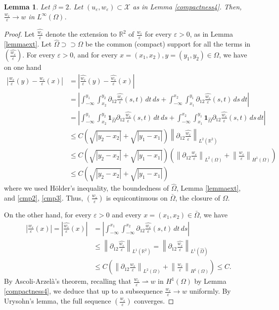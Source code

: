 \documentclass[a4, 11pt, reqno, final]{amsart}
\newcommand{\calX}{\mathcal{X}}
\newcommand{\bbR}{\mathbb{R}}
\newcommand{\n}[1]{\left\|#1\right\|}  %
\newcommand\e{\varepsilon}
\newcommand\weak{\rightharpoonup} %
\theoremstyle{plain}%
\newtheorem{lemma}[theorem]{Lemma}
\newcommand{\QED}{\hspace{1ex}\hfill$\blacksquare$\vspace{2ex}}
\begin{document}
	\begin{lemma}\label{lemmaunif} Let $\beta =2$.
		Let $(u_\e, w_{\e})\subset \calX$  as in Lemma \ref{compactness4}. Then,
		$\frac{w_\e}{\e} \to w$ in $L^\infty(\Omega)$.
	\end{lemma}
	\begin{proof}
		Let $\hat{\frac{w_\e}{\e}}$ denote the extension to $\mathbb{R}^2$ of $\frac{w_\e}{\e}$ for every $\e>0$, as in Lemma \ref{lemmaext}. Let $\hat{\Omega}\supset\supset \Omega$ be the common (compact) support for all the terms in $(\hat{\frac{w_\e}{\e}})$.
		For every $\e>0$, and for every $x=(x_1,x_2),y=(y_1,y_2) \in \Omega$, we have on one hand
		$$ \begin{aligned}
			|\frac{w_\e}{\e}(y) - \frac{w_\e}{\e}(x)| &= |\hat{\frac{w_\e}{\e}}(y) - \hat{\frac{w_\e}{\e}}(x)|\\
			&= |\int_{-\infty}^{y_1}\int_{x_2}^{y_2}\partial_{12}\hat{\frac{w_\e}{\e}}(s,t) \, dt\,ds + \int_{-\infty}^{x_2}\int_{x_1}^{y_1}\partial_{12}\hat{\frac{w_\e}{\e}}(s,t) \, ds\,dt|\\
			&= |\int_{-\infty}^{y_1}\int_{x_2}^{y_2}\mathbf{1}_{\hat{\Omega}}\partial_{12}\hat{\frac{w_\e}{\e}}(s,t) \, dt\,ds + \int_{-\infty}^{x_2}\int_{x_1}^{y_1}\mathbf{1}_{\hat{\Omega}}\partial_{12}\hat{\frac{w_\e}{\e}}(s,t) \, ds\,dt|\\
			&\leq C (\sqrt{|y_2-x_2|} + \sqrt{|y_1-x_1|})\n{\partial_{12}\hat{\frac{w_\e}{\e}}}_{L^2(\bbR^2)}\\
			&\leq C (\sqrt{|y_2-x_2|} + \sqrt{|y_1-x_1|})(\n{\partial_{12}\frac{w_\e}{\e}}_{L^2(\Omega)} + \n{\frac{w_\e}{\e}}_{H^1(\Omega)})\\
			&\leq C (\sqrt{|y_2-x_2|} + \sqrt{|y_1-x_1|})
		\end{aligned}$$
		where we used H\"older's inequality, the boundedness of $\hat{\Omega}$, Lemma \ref{lemmaext}, and \eqref{cmp2}, \eqref{cmp3}. Thus, $(\frac{w_\e}{\e})$ is equicontinuous on $\bar\Omega$, the closure of $\Omega$.

		On the other hand, for every $\e>0$ and every $x=(x_1,x_2) \in \bar\Omega$, we have
		$$ \begin{aligned}
			|\frac{w_\e}{\e}(x)|  = |\hat{\frac{w_\e}{\e}}(x)| &= |\int_{-\infty}^{x_1}\int_{-\infty}^{x_2}\partial_{12} \hat{\frac{w_\e}{\e}}(s,t) \, dt\,ds|\\
			&\leq \n{\partial_{12}\hat{\frac{w_\e}{\e}}}_{L^1(\bbR^2)}
			= \n{\partial_{12}\hat{\frac{w_\e}{\e}}}_{L^1(\hat{\Omega})}\\
			&\leq C (\n{\partial_{12}\frac{w_\e}{\e}}_{L^2(\Omega)} + \n{\frac{w_\e}{\e}}_{H^1(\Omega)}) \leq C.
		\end{aligned}$$
		By Ascoli-Arzelà's theorem, recalling that $\frac{w_\e}{\e} \weak w$ in $H^1(\Omega)$ by Lemma \ref{compactness4}, we deduce that up to a subsequence $\frac{w_\e}{\e} \to w$ uniformly. By Urysohn's lemma, the full sequence $(\frac{w_\e}{\e})$ converges.
	\end{proof}
\end{document}
